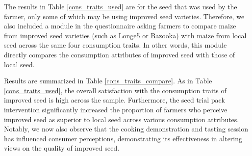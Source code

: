 \documentclass[english]{article}\usepackage[]{graphicx}\usepackage[]{xcolor}
\begin{document}
The results in Table \ref{cons_traits_used} are for the seed that
was used by the farmer, only some of which may be using improved seed
varieties. Therefore, we also included a module in the questionnaire
asking farmers to compare maize from improved seed varieties (such
as Longe5 or Bazooka) with maize from local seed across the same four
consumption traits. In other words, this module directly compares
the consumption attributes of improved seed with those of local seed.

Results are summarized in Table \ref{cons_traits_compare}. As in
Table \ref{cons_traits_used}, the overall satisfaction with the consumption
traits of improved seed is high across the sample. Furthermore, the
seed trial pack intervention significantly increased the proportion
of farmers who perceive improved seed as superior to local seed across
various consumption attributes. Notably, we now also observe that
the cooking demonstration and tasting session has influenced consumer
perceptions, demonstrating its effectiveness in altering views on
the quality of improved seed.
\end{document}
